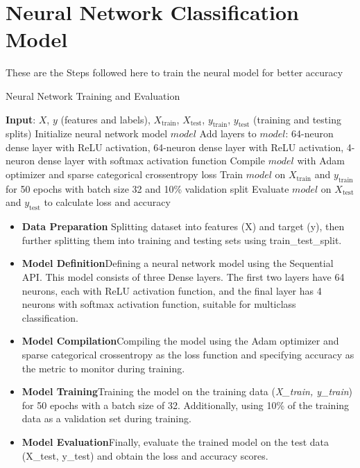 \section{Neural Network Classification Model}
These are the Steps followed here to train the neural model for better accuracy


\begin{algorithm}
\caption{Neural Network Training and Evaluation}\label{alg:neural_network}
\begin{algorithmic}
\STATE \textbf{Input}: $X$, $y$ (features and labels), $X_{\text{train}}$, $X_{\text{test}}$, $y_{\text{train}}$, $y_{\text{test}}$ (training and testing splits)
\STATE Initialize neural network model $model$
\STATE Add layers to $model$: 64-neuron dense layer with ReLU activation, 64-neuron dense layer with ReLU activation, 4-neuron dense layer with softmax activation function
\STATE Compile $model$ with Adam optimizer and sparse categorical crossentropy loss
\STATE Train $model$ on $X_{\text{train}}$ and $y_{\text{train}}$ for 50 epochs with batch size 32 and 10\% validation split
\STATE Evaluate $model$ on $X_{\text{test}}$ and $y_{\text{test}}$ to calculate loss and accuracy
\end{algorithmic}
\end{algorithm}

\begin{itemize}
    \item \textbf{Data Preparation} Splitting dataset into features (X) and target (y), then further splitting them into training and testing sets using train\_test\_split.
    \item \textbf{Model Definition}Defining a neural network model using the Sequential API. This model consists of three Dense layers. The first two layers have 64 neurons, each with ReLU activation function, and the final layer has 4 neurons with softmax activation function, suitable for multiclass classification.
    \item \textbf{Model Compilation}Compiling the model using the Adam optimizer and sparse categorical crossentropy as the loss function and specifying accuracy as the metric to monitor during training.
    \item \textbf{Model Training}Training the model on the training data (\textit{X\_train, y\_train}) for 50 epochs with a batch size of 32. Additionally, using 10\% of the training data as a validation set during training.
    \item \textbf{Model Evaluation}Finally, evaluate the trained model on the test data (X\_test, y\_test) and obtain the loss and accuracy scores.
\end{itemize}



